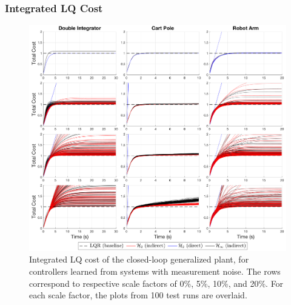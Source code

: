 \subsubsection{Integrated LQ Cost}
\begin{figure}[H]
\centering
	\includegraphics[width=\textwidth]{figures/noise_integrated_cost3.png}
\caption{Integrated LQ cost of the closed-loop generalized plant, for controllers learned from systems with measurement noise.  The rows correspond to respective scale factors of 0\%, 5\%, 10\%, and 20\%.  For each scale factor, the plots from 100 test runs are overlaid.}
\label{fig:noise_integrated_cost3}
\end{figure}

\newpage

